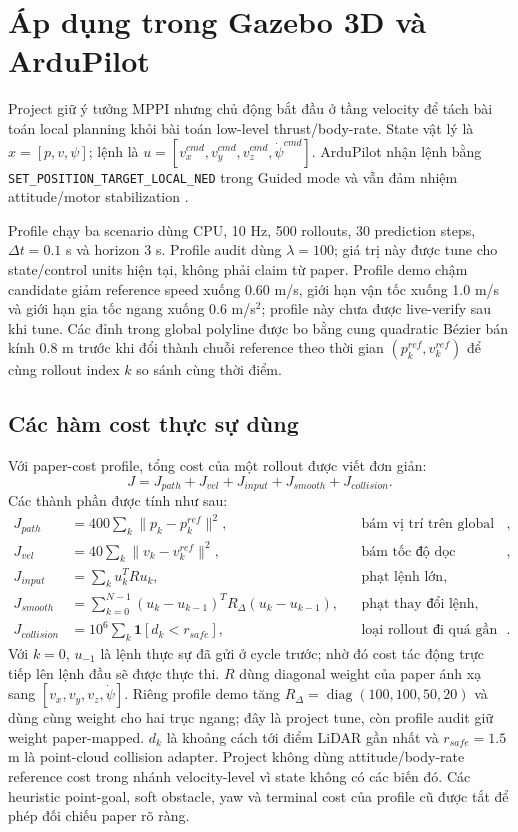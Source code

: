 \documentclass[10pt,a4paper]{article}
\newcommand{\code}[1]{\texttt{#1}}
\begin{document}
\section{Áp dụng trong Gazebo 3D và ArduPilot}

Project giữ ý tưởng MPPI nhưng chủ động bắt đầu ở tầng velocity để tách bài toán
local planning khỏi bài toán low-level thrust/body-rate. State vật lý là
$x=[p,v,\psi]$; lệnh là
$u=[v_x^{cmd},v_y^{cmd},v_z^{cmd},\dot\psi^{cmd}]$. ArduPilot nhận lệnh bằng
\code{SET\_POSITION\_TARGET\_LOCAL\_NED} trong Guided mode và vẫn đảm nhiệm
attitude/motor stabilization \cite{mavlinkCommon2026,ardupilotGuidedDocs2026}.

Profile chạy ba scenario dùng CPU, 10 Hz, 500 rollouts, 30 prediction steps,
$\Delta t=0.1$ s và horizon 3 s. Profile audit dùng $\lambda=100$; giá trị này
được tune cho state/control units hiện tại, không phải claim từ paper. Profile
demo chậm candidate giảm reference speed xuống 0.60 m/s, giới hạn vận tốc xuống
1.0 m/s và giới hạn gia tốc ngang xuống 0.6 m/s$^2$; profile này chưa được
live-verify sau khi tune. Các đỉnh trong global polyline được bo bằng cung
quadratic Bézier bán kính 0.8 m trước khi đổi thành chuỗi reference theo thời gian
$(p_k^{ref},v_k^{ref})$ để cùng rollout index $k$ so sánh cùng thời điểm.

\subsection{Các hàm cost thực sự dùng}

Với paper-cost profile, tổng cost của một rollout được viết đơn giản:
\begin{equation}
J=J_{path}+J_{vel}+J_{input}+J_{smooth}+J_{collision}.
\end{equation}
Các thành phần được tính như sau:
\begin{align}
J_{path}&=400\sum_k\|p_k-p_k^{ref}\|^2,
&&\text{bám vị trí trên global path},\\
J_{vel}&=40\sum_k\|v_k-v_k^{ref}\|^2,
&&\text{bám tốc độ dọc reference},\\
J_{input}&=\sum_k u_k^TRu_k,
&&\text{phạt lệnh lớn},\\
J_{smooth}&=\sum_{k=0}^{N-1}(u_k-u_{k-1})^TR_\Delta(u_k-u_{k-1}),
&&\text{phạt thay đổi lệnh},\\
J_{collision}&=10^6\sum_k\mathbf{1}[d_k<r_{safe}],
&&\text{loại rollout đi quá gần point cloud}.
\end{align}
Với $k=0$, $u_{-1}$ là lệnh thực sự đã gửi ở cycle trước; nhờ đó cost tác động
trực tiếp lên lệnh đầu sẽ được thực thi. $R$ dùng diagonal weight của paper ánh
xạ sang $[v_x,v_y,v_z,\dot\psi]$. Riêng profile demo tăng
$R_\Delta=\operatorname{diag}(100,100,50,20)$ và dùng cùng weight cho hai trục
ngang; đây là project tune, còn profile audit giữ weight paper-mapped. $d_k$ là khoảng cách tới
điểm LiDAR gần nhất và $r_{safe}=1.5$ m là point-cloud collision adapter. Project
không dùng attitude/body-rate reference cost trong nhánh velocity-level vì state
không có các biến đó. Các heuristic point-goal, soft obstacle, yaw và terminal
cost của profile cũ được tắt để phép đối chiếu paper rõ ràng.
\end{document}
